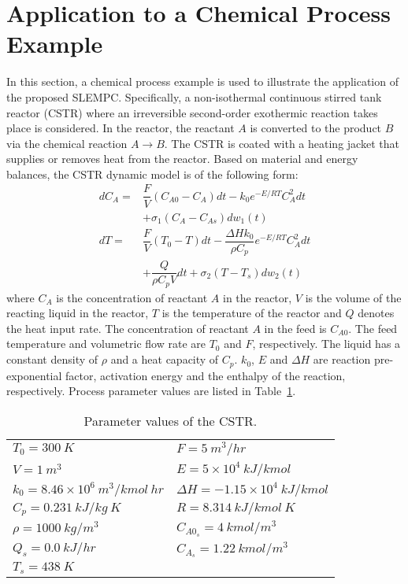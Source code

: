 \documentclass[letterpaper, 10pt, conference]{ieeeconf}
\begin{document}
\section{Application to a Chemical Process Example}
In this section, a chemical process example is used to illustrate the application of the proposed SLEMPC. Specifically, a non-isothermal continuous stirred tank reactor (CSTR) where an irreversible second-order exothermic reaction takes place is considered. In the reactor, the reactant $A$ is converted to the product $B$ via the chemical reaction $A \rightarrow B$. The CSTR is coated with a heating jacket that supplies or removes heat from the reactor. Based on material and energy balances, the CSTR dynamic model is of the following form:
\begin{subequations}
	\label{eq:CSTR:ODEs}
	\begin{align}
	{dC_{A}}  =& \dfrac{F}{V}(C_{A0}-C_{A}){dt}-k_0e^{-E/RT}C_{A}^2{dt}\nonumber\\
	&+\sigma_1 (C_A-C_{As})dw_1(t) \label{eq:CSTR:ODEs a} \\[1ex]
	{dT}  =& \dfrac{F}{V}(T_{0}-T){dt} - \dfrac{\Delta H k_0}{\rho C_p} e^{-E/RT}C_{A}^2{dt}\nonumber\\
	&+\dfrac{Q}{\rho C_pV}{dt} +\sigma_2(T-T_s) dw_2(t) \label{eq:CSTR:ODEs c}
	\end{align}
\end{subequations}
where $C_{A}$ is the concentration of reactant $A$ in the reactor, $V$ is the volume of the reacting liquid in the reactor, $T$ is the temperature of the reactor and $Q$ denotes the heat input rate. The concentration of reactant $A$ in the feed is $C_{A0}$. The feed temperature and volumetric flow rate are $T_0$ and $F$, respectively. The liquid has a constant density of $\rho$ and a heat capacity of $C_p$. $k_0$, $E$ and $\Delta H$ are reaction pre-exponential factor, activation energy and the enthalpy of the reaction, respectively. Process parameter values are listed in Table~\ref{tbl:ecosysid:parameters}. 

\begin{table}[h]
	\centering
	\caption{Parameter values of the CSTR.}
	\label{tbl:ecosysid:parameters}
	\begin{tabular}{ll}
		\toprule
		$T_{0}=300 ~K$ 						& $F=5 ~m^3/hr$ 						\\[1ex]
		$V=1 ~m^3$ 						& $E=5\times 10^4 ~kJ/kmol$  			\\[1ex]
		$k_0=8.46\times 10^6 ~m^3/kmol~hr$ 	& $\Delta H= -1.15\times 10^4 ~kJ/kmol$ \\[1ex]
		$C_p=0.231 ~kJ/kg~K$ 				& $R=8.314 ~kJ/kmol~K$ 					\\[1ex]
		$\rho=1000 ~kg/m^3$            &$C_{A0_s}=4 ~kmol/m^3$   \\[1ex] 
		$Q_s=0.0 ~kJ/hr$            & $C_{A_s}=1.22 ~kmol/m^3$   \\[1ex]
		$T_s=438 ~K$\\
		\bottomrule
	\end{tabular}
\end{table}
\end{document}
